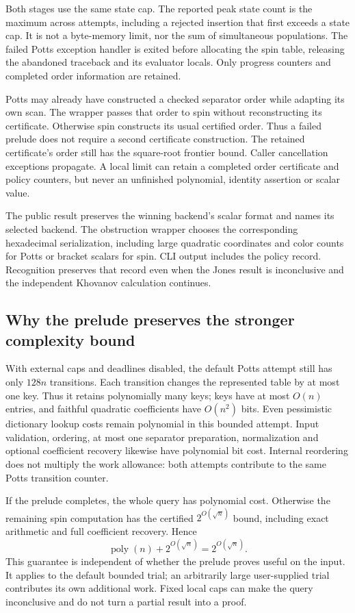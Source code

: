 Both stages use the same state cap. The reported peak state count is the
maximum across attempts, including a rejected insertion that first exceeds
a state cap. It is not a byte-memory limit, nor the sum of simultaneous
populations. The failed Potts exception handler is exited before allocating
the spin table, releasing the abandoned traceback and its evaluator locals.
Only progress counters and completed order information are retained.

Potts may already have constructed a checked separator order while adapting
its own scan. The wrapper passes that order to spin without reconstructing
its certificate. Otherwise spin constructs its usual certified order.
Thus a failed prelude does not require a second certificate construction.
The retained certificate's order still has the square-root frontier bound.
Caller cancellation exceptions propagate. A local limit can retain a completed
order certificate and policy counters, but never an unfinished polynomial,
identity assertion or scalar value.

The public result preserves the winning backend's scalar format and names
its selected backend. The obstruction wrapper chooses the corresponding
hexadecimal serialization, including large quadratic coordinates and color
counts for Potts or bracket scalars for spin. CLI output includes the policy
record. Recognition preserves that record even when the Jones result is
inconclusive and the independent Khovanov calculation continues.

\subsection{Why the prelude preserves the stronger complexity bound}
With external caps and deadlines disabled, the default Potts attempt still
has only $128n$ transitions. Each transition changes the represented table
by at most one key. Thus it retains polynomially many keys; keys have at most
$O(n)$ entries, and faithful quadratic coefficients have $O(n^2)$ bits.
Even pessimistic dictionary lookup costs remain polynomial in this bounded
attempt. Input validation, ordering, at most one separator preparation,
normalization and optional coefficient recovery likewise have polynomial
bit cost. Internal reordering does not multiply the work allowance: both
attempts contribute to the same Potts transition counter.

If the prelude completes, the whole query has polynomial cost. Otherwise
the remaining spin computation has the certified $2^{O(\sqrt n)}$ bound,
including exact arithmetic and full coefficient recovery. Hence
\[
 \operatorname{poly}(n)+2^{O(\sqrt n)}=2^{O(\sqrt n)}.
\]
This guarantee is independent of whether the prelude proves useful on the
input. It applies to the default bounded trial; an arbitrarily large
user-supplied trial contributes its own additional work. Fixed local caps
can make the query inconclusive and do not turn a partial result into a proof.

